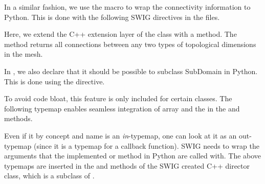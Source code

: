 In a similar fashion, we use the  macro to wrap the connectivity information to Python. This is done with the following SWIG directives in the  files.
Here, we extend the C++ extension layer of the
 class with a 
method. The method returns all connections between any two types of topological dimensions in the mesh.

In , we also declare that it should be possible to subclass SubDomain in Python. This is done using the  directive.
\begin{swigcode}
\end{swigcode}
To avoid code bloat, this feature is only included for certain classes.
The following typemap enables seamless integration of
\numpy array and the  in  
the  and  methods. 
Even if it by concept and name is an \textit{in}-typemap, one can look at it as an out-typemap
(since it is a typemap for a callback function). SWIG needs to wrap the arguments that the implemented  or  method in Python are called with. The above typemaps are inserted in the  and  methods of the SWIG created C++ director class, which is a subclass of .

